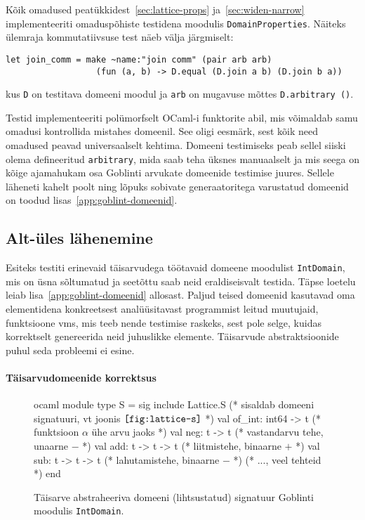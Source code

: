 \documentclass[../thesis.tex]{subfiles}
\begin{document}
Kõik omadused peatükkidest~\ref{sec:lattice-props} ja~\ref{sec:widen-narrow} implementeeriti omaduspõhiste testidena moodulis \texttt{DomainProperties}. Näiteks ülemraja kommutatiivsuse test näeb välja järgmiselt:
\begin{verbatim}
let join_comm = make ~name:"join comm" (pair arb arb)
                  (fun (a, b) -> D.equal (D.join a b) (D.join b a))
\end{verbatim}
kus \texttt{D} on testitava domeeni moodul ja \texttt{arb} on mugavuse mõttes \texttt{D.arbitrary ()}.

Testid implementeeriti polümorfselt OCaml-i funktorite abil, mis võimaldab samu omadusi kontrollida mistahes domeenil. See oligi eesmärk, sest kõik need omadused peavad universaalselt kehtima. Domeeni testimiseks peab sellel siiski olema defineeritud \texttt{arbitrary}, mida saab teha üksnes manuaalselt ja mis seega on kõige ajamahukam osa Goblinti arvukate domeenide testimise juures. Sellele läheneti kahelt poolt ning lõpuks sobivate generaatoritega varustatud domeenid on toodud lisas~\ref{app:goblint-domeenid}.

\subsection{Alt-üles lähenemine}
Esiteks testiti erinevaid täisarvudega töötavaid domeene moodulist \texttt{IntDomain}, mis on üsna sõltumatud ja seetõttu saab neid eraldiseisvalt testida. Täpse loetelu leiab lisa~\ref{app:goblint-domeenid} allosast. Paljud teised domeenid kasutavad oma elementidena konkreetsest analüüsitavast programmist leitud muutujaid, funktsioone vms, mis teeb nende testimise raskeks, sest pole selge, kuidas korrektselt genereerida neid juhuslikke elemente. Täisarvude abstraktsioonide puhul seda probleemi ei esine.

\paragraph{Täisarvudomeenide korrektsus}
\begin{figure}
	\centering
	\begin{bminted}[mathescape]{ocaml}
		module type S =
		sig
		  include Lattice.S (* sisaldab domeeni signatuuri, vt joonis $\texttt{\ref{fig:lattice-s}}$ *)
		  val of_int: int64 -> t (* funktsioon $\alpha$ ühe arvu jaoks *)
		  val neg: t -> t (* vastandarvu tehe, unaarne $-$ *)
		  val add: t -> t -> t (* liitmistehe, binaarne $+$ *)
		  val sub: t -> t -> t (* lahutamistehe, binaarne $-$ *)
		  (* ..., veel tehteid *)
		end
	\end{bminted}
	\caption{Täisarve abstraheeriva domeeni (lihtsustatud) signatuur Goblinti moodulis \texttt{IntDomain}.}
	\label{fig:intdomain-s}
\end{figure}
\end{document}

